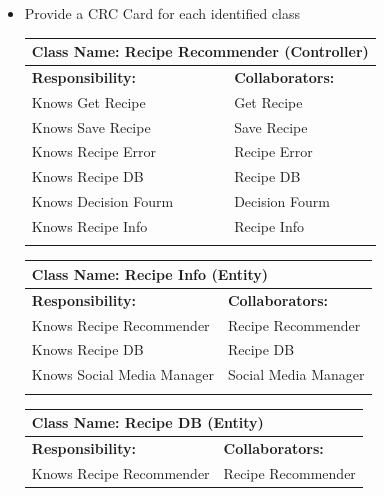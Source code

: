 \documentclass[]{article}
\begin{document}
\begin{itemize}
	\item Provide a CRC Card for each identified class
	\begin{table}[ht]
		\centering
		\begin{tabular}{|p{6cm}|p{6cm}|}
		\hline 
		\multicolumn{2}{|l|}{\textbf{Class Name: Recipe Recommender (Controller)}} \\
		\hline
		\textbf{Responsibility:} & \textbf{Collaborators:} \\
		\hline
		Knows Get Recipe & Get Recipe\\
		Knows Save Recipe & Save Recipe\\
		Knows Recipe Error & Recipe Error\\
		Knows Recipe DB & Recipe DB\\
		Knows Decision Fourm & Decision Fourm\\
		Knows Recipe Info & Recipe Info\\
		\vspace{1in} & \\
		\hline
		\end{tabular}
	\end{table}
	\begin{table}[ht]
		\centering
		\begin{tabular}{|p{6cm}|p{6cm}|}
		\hline 
		\multicolumn{2}{|l|}{\textbf{Class Name: Recipe Info (Entity)}} \\
		\hline
		\textbf{Responsibility:} & \textbf{Collaborators:} \\
		\hline
		Knows Recipe Recommender & Recipe Recommender \\
		Knows Recipe DB & Recipe DB \\
            Knows Social Media Manager & Social Media Manager \\
		\vspace{1in} & \\
		\hline
		\end{tabular}
	\end{table}
	\begin{table}[ht]
		\centering
		\begin{tabular}{|p{6cm}|p{6cm}|}
		\hline 
		\multicolumn{2}{|l|}{\textbf{Class Name: Recipe DB (Entity)}} \\
		\hline
		\textbf{Responsibility:} & \textbf{Collaborators:} \\
		\hline
		Knows Recipe Recommender & Recipe Recommender \\

\end{tabular}
\end{table}
\end{itemize}
\end{document}

